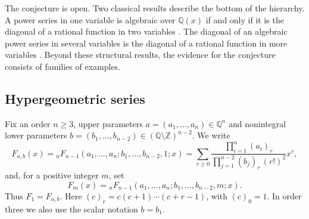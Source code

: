 \documentclass[11pt]{amsart}
\theoremstyle{definition}
\theoremstyle{remark}
\numberwithin{equation}{section}
\newcommand{\Q}{\mathbb{Q}}
\newcommand{\Z}{\mathbb{Z}}
\newcommand{\Fab}{F_{a,b}}
\begin{document}
The conjecture is open. Two classical results describe the bottom of the hierarchy. A power series in one variable is algebraic over $\Q(x)$ if and only if it is the diagonal of a rational function in two variables \citep{Polya1922,Furstenberg1967}. The diagonal of an algebraic power series in several variables is the diagonal of a rational function in more variables \citep{DenefLipshitz1987}. Beyond these structural results, the evidence for the conjecture consists of families of examples.

\subsection{Hypergeometric series}
Fix an order $n\ge3$, upper parameters $a=(a_1,\dots,a_n)\in\Q^n$ and nonintegral lower parameters $b=(b_1,\dots,b_{n-2})\in(\Q\setminus\Z)^{n-2}$. We write
\begin{equation}\label{eq:Fab}
\Fab(x)={}_nF_{n-1}(a_1,\dots,a_n;b_1,\dots,b_{n-2},1;x)
=\sum_{r\ge0}\frac{\prod_{i=1}^n(a_i)_r}{\prod_{j=1}^{n-2}(b_j)_r\,(r!)^2}x^r,
\end{equation}
and, for a positive integer $m$, set
\begin{equation}\label{eq:Fm}
F_m(x)={}_nF_{n-1}(a_1,\dots,a_n;b_1,\dots,b_{n-2},m;x).
\end{equation}
Thus $F_1=\Fab$. Here $(c)_r=c(c+1)\cdots(c+r-1)$, with $(c)_0=1$. In order three we also use the scalar notation $b=b_1$.
\end{document}
